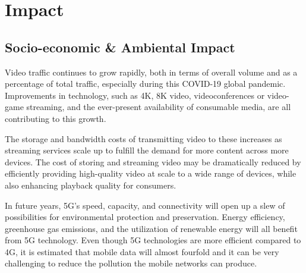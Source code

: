 \chapter{Impact} \label{chap:impact}


\section{Socio-economic \& Ambiental Impact} \label{sec:social_impact}

Video traffic continues to grow rapidly, both in terms of overall volume 
and as a percentage of total traffic, especially during this COVID-19
global pandemic. 
Improvements in technology, such as 
4K, 8K video, videoconferences or video-game streaming, and the ever-present 
availability of consumable media, are all contributing to this growth.

The storage and bandwidth costs of transmitting video to these 
increases as streaming services scale up to fulfill the demand for more 
content across more devices. The cost of storing and streaming video may 
be dramatically reduced by 
efficiently providing high-quality video at scale to a wide range of devices, 
while also enhancing playback quality for consumers.

In future years, 5G's speed, capacity, and connectivity will open up a slew of 
possibilities for environmental protection and preservation. Energy efficiency, 
greenhouse gas emissions, and the utilization of renewable energy will all benefit from 
5G technology. Even though 5G technologies are more efficient 
compared to 4G, it is estimated that mobile data will almost fourfold\cite{gsm1} and 
it can be very challenging to reduce the pollution the mobile networks
can produce.